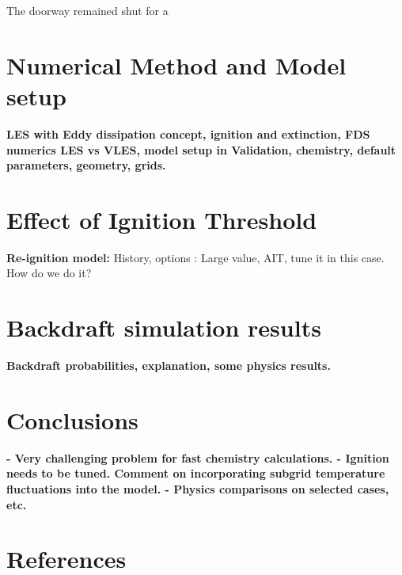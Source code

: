 \documentclass[12pt,letterpaper]{article}
\begin{document}
\begin{flushleft}
The doorway remained shut for a 

\section{Numerical Method and Model setup}

\textbf{LES with Eddy dissipation concept, ignition and extinction, FDS numerics  LES vs VLES, model setup in Validation, chemistry, default parameters, geometry, grids.}



\section{Effect of Ignition Threshold}

\textbf{Re-ignition model:} History, options : Large value, AIT, tune it in this case. How do we do it?

\section{Backdraft simulation results}

\textbf{Backdraft probabilities, explanation, some physics results.}


\section{Conclusions}

\textbf{- Very challenging problem for fast chemistry calculations. - Ignition needs to be tuned. Comment on incorporating subgrid temperature fluctuations into the model. - Physics comparisons on selected cases, etc.}

\section*{References}


	
%	
%	
%
%	
	

\end{flushleft}
\end{document}

